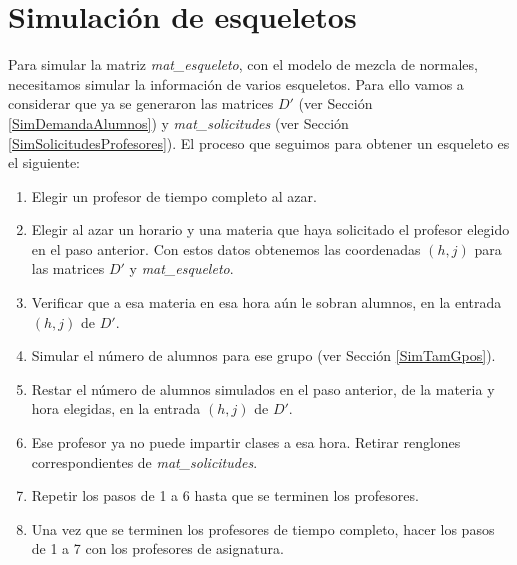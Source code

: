 \section{Simulación de esqueletos} \label{sec_gen_esqueleto}

Para simular la matriz \textit{mat\_esqueleto}, con el modelo de mezcla de normales, necesitamos simular la información de varios esqueletos. Para ello vamos a considerar que ya se generaron las matrices $D'$ (ver Sección \ref{SimDemandaAlumnos}) y \textit{mat\_solicitudes} (ver Sección \ref{SimSolicitudesProfesores}). El proceso que seguimos para obtener un esqueleto es el siguiente:
  
  \begin{enumerate}
%

\item Elegir un profesor de tiempo completo al azar.

\item Elegir al azar un horario y una materia que haya solicitado el profesor elegido en el paso anterior. Con estos datos obtenemos las coordenadas $(h,j)$ para las matrices $D'$ y \textit{mat\_esqueleto}.

\item Verificar que a esa materia en esa hora aún le sobran alumnos, en la entrada $(h,j)$ de $D'$.

\item Simular el número de alumnos para ese grupo (ver Sección \ref{SimTamGpos}).

\item Restar el número de alumnos simulados en el paso anterior, de la materia y hora elegidas, en la entrada $(h,j)$ de $D'$.

\item Ese profesor ya no puede impartir clases a esa hora. Retirar renglones correspondientes de \textit{mat\_solicitudes}.

\item Repetir los pasos de 1 a 6 hasta que se terminen los profesores.

\item Una vez que se terminen los profesores de tiempo completo, hacer los pasos de 1 a 7 con los profesores de asignatura.
\end{enumerate}

